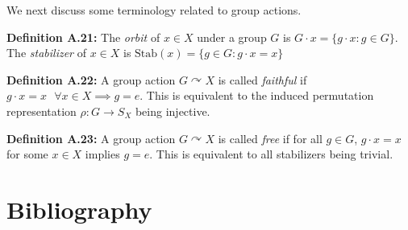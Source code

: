 \documentclass[12pt]{article}
\newcommand{\vs}{\vskip10pt}
\begin{document}
	\vs 
	
	We next discuss some terminology related to group actions.
	
	\vs
	
	\textbf{Definition A.21: } The \textit{orbit} of $x \in X$ under a group $G$ is $G\cdot x = \{g \cdot x: g \in G\}$. The \textit{stabilizer} of $x \in X$ is $\text{Stab}(x) = \{g \in G: g\cdot x = x\}$
	
	\vs
	
	\textbf{Definition A.22: } A group action $G \curvearrowright X$ is called \textit{faithful} if $g \cdot x = x \text{ } \forall x \in X \implies g = e$. This is equivalent to the induced permutation representation $\rho: G \rightarrow S_X$ being injective. 
	
	\vs 
	
	\textbf{Definition A.23: } A group action $G \curvearrowright X$ is called \textit{free} if for all $g \in G$, $g \cdot x = x$ for some $x \in X$ implies $g = e$. This is equivalent to all stabilizers being trivial.
	
	\newpage
	
	\section{Bibliography}
	
\end{document}
